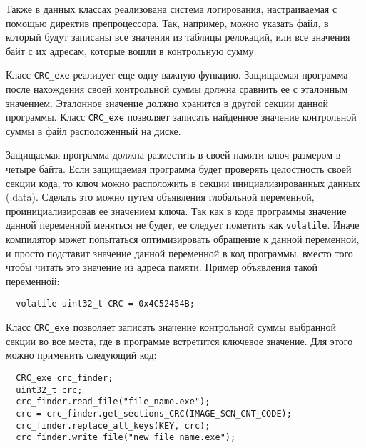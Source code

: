 Также в данных классах реализована система логирования, настраиваемая с помощью
директив препроцессора. Так, например, можно указать файл, в который будут
записаны все значения из таблицы релокаций, или все значения байт с их адресам,
которые вошли в контрольную сумму.

Класс \verb!CRC_exe! реализует еще одну важную функцию. Защищаемая программа
после нахождения своей контрольной суммы должна сравнить ее с эталонным
значением. Эталонное значение должно хранится в другой секции данной программы.
Класс \verb!CRC_exe! позволяет записать найденное значение контрольной суммы в
файл расположенный на диске. 

Защищаемая программа должна разместить в своей памяти ключ размером в четыре
байта. Если защищаемая программа будет проверять целостность своей секции кода,
то ключ можно расположить в секции инициализированных данных (.data). Сделать
это можно путем объявления глобальной переменной, проинициализировав ее
значением ключа. Так как в коде программы значение данной переменной меняться не
будет, ее следует пометить как \verb!volatile!. Иначе компилятор может
попытаться оптимизировать обращение к данной переменной, и просто подставит
значение данной переменной в код программы, вместо того чтобы читать это
значение из адреса памяти. Пример объявления такой переменной:
\begin{verbatim}
  volatile uint32_t CRC = 0x4C52454B;
\end{verbatim}

Класс \verb!CRC_exe! позволяет записать значение контрольной суммы выбранной
секции во все места, где в программе встретится ключевое значение. Для этого
можно применить следующий код:
\begin{verbatim}
  CRC_exe crc_finder;
  uint32_t crc;
  crc_finder.read_file("file_name.exe");
  crc = crc_finder.get_sections_CRC(IMAGE_SCN_CNT_CODE);
  crc_finder.replace_all_keys(KEY, crc);
  crc_finder.write_file("new_file_name.exe");
\end{verbatim}

